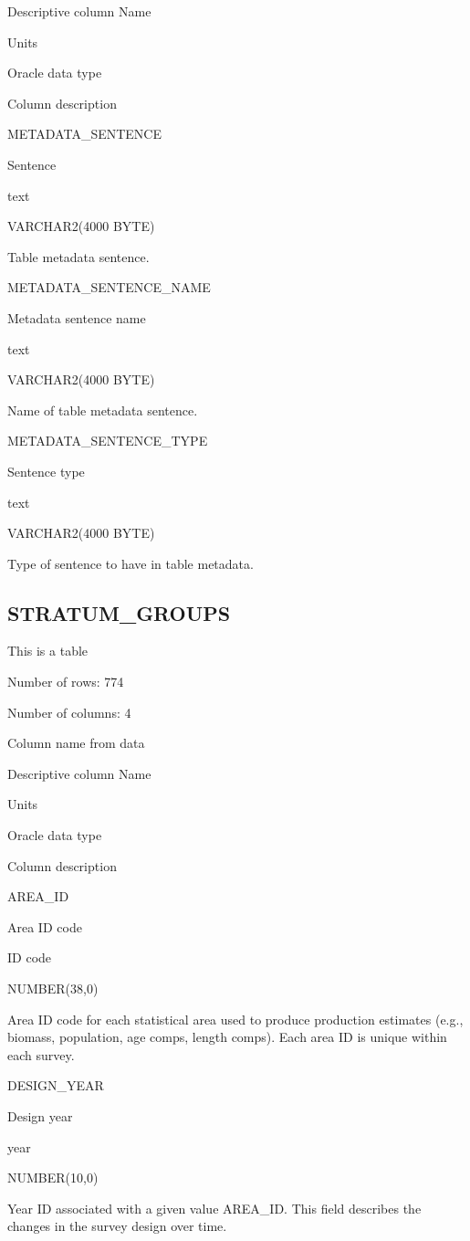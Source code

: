 \documentclass[
  letterpaper,
  oneside,
  open=any]{scrbook}
\begin{document}
Descriptive column Name

Units

Oracle data type

Column description

METADATA\_SENTENCE

Sentence

text

VARCHAR2(4000 BYTE)

Table metadata sentence.

METADATA\_SENTENCE\_NAME

Metadata sentence name

text

VARCHAR2(4000 BYTE)

Name of table metadata sentence.

METADATA\_SENTENCE\_TYPE

Sentence type

text

VARCHAR2(4000 BYTE)

Type of sentence to have in table metadata.

\hypertarget{stratum_groups}{%
\subsection{STRATUM\_GROUPS}\label{stratum_groups}}

This is a table

Number of rows: 774

Number of columns: 4

Column name from data

Descriptive column Name

Units

Oracle data type

Column description

AREA\_ID

Area ID code

ID code

NUMBER(38,0)

Area ID code for each statistical area used to produce production
estimates (e.g., biomass, population, age comps, length comps). Each
area ID is unique within each survey.

DESIGN\_YEAR

Design year

year

NUMBER(10,0)

Year ID associated with a given value AREA\_ID. This field describes the
changes in the survey design over time.
\end{document}
